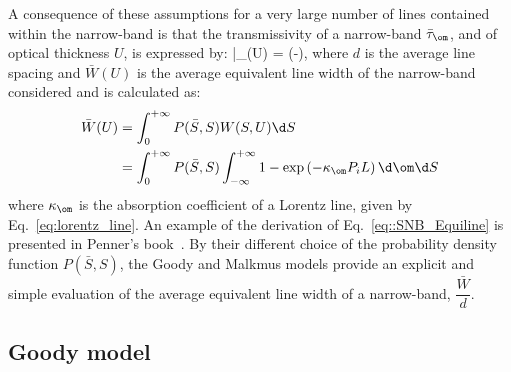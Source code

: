 A consequence of these assumptions for a very large number of lines contained within the narrow-band is that the transmissivity of a narrow-band $\bar{\tau}_{\om}$, and of optical thickness $U$, is expressed by:
\be\label{eq:SNB_tau_equiline}
\bar{\tau}_{\om}(U) = \exp\left(-\displaystyle{}\right),
\ee
where $d$ is the average line spacing and $\bar{W}(U)$ is the average equivalent line width of the narrow-band considered and is calculated as:
\begin{align}\label{eq::SNB_Equiline}
\bar{W}(U) &= \displaystyle\int_{0}^{+\infty}{P(\bar{S},S)W(S,U) \d S} \nonumber \\
           &= \displaystyle\int_{0}^{+\infty}{P(\bar{S},S)\displaystyle\int_{-\infty}^{+\infty}{1 - \exp\left(-\kappa_{\om} P_i L\right) \d\om} \d S}
\end{align}
where $\kappa_{\om}$ is the absorption coefficient of a Lorentz line, given by Eq.~\ref{eq:lorentz_line}. An example of the derivation of Eq.~\ref{eq::SNB_Equiline} is presented in Penner's book~\cite{Penner1959}. By their different choice of the probability density function $P(\bar{S},S)$, the Goody and Malkmus models provide an explicit and simple evaluation of the average equivalent line width of a narrow-band, $\dfrac{\bar{W}}{d}$.

\subsection{Goody model}\label{sec:goody_model}

